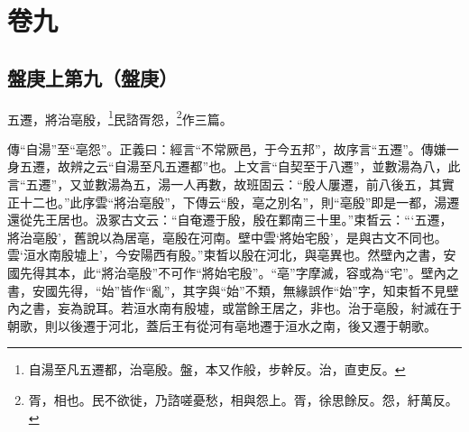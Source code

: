 

\chapter{卷九}


\section{盤庚上第九（盤庚）}


五遷，將治亳殷，\footnote{自湯至凡五遷都，治亳殷。盤，本又作般，步幹反。治，直吏反。}民諮胥怨，\footnote{胥，相也。民不欲徙，乃諮嗟憂愁，相與怨上。胥，徐思餘反。怨，紆萬反。}作三篇。

{\noindent\zhuan{}\fzbyks 傳“自湯”至“亳怨”。正義曰：經言“不常厥邑，于今五邦”，故序言“五遷”。傳嫌一身五遷，故辨之云“自湯至凡五遷都”也。上文言“自契至于八遷”，並數湯為八，此言“五遷”，又並數湯為五，湯一人再數，故班固云：“殷人屢遷，前八後五，其實正十二也。”此序雲“將治亳殷”，下傳云“殷，亳之別名”，則“亳殷”即是一都，湯遷還從先王居也。汲冢古文云：“自奄遷于殷，殷在鄴南三十里。”束晳云：“‘五遷，將治亳殷’，舊說以為居亳，亳殷在河南。壁中雲‘將始宅殷’，是與古文不同也。雲‘洹水南殷墟上’，今安陽西有殷。”束晳以殷在河北，與亳異也。然壁內之書，安國先得其本，此“將治亳殷”不可作“將始宅殷”。“亳”字摩滅，容或為“宅”。壁內之書，安國先得，“始”皆作“亂”，其字與“始”不類，無緣誤作“始”字，知束晳不見壁內之書，妄為說耳。若洹水南有殷墟，或當餘王居之，非也。治于亳殷，紂滅在于朝歌，則以後遷于河北，蓋后王有從河有亳地遷于洹水之南，後又遷于朝歌。 \par}

